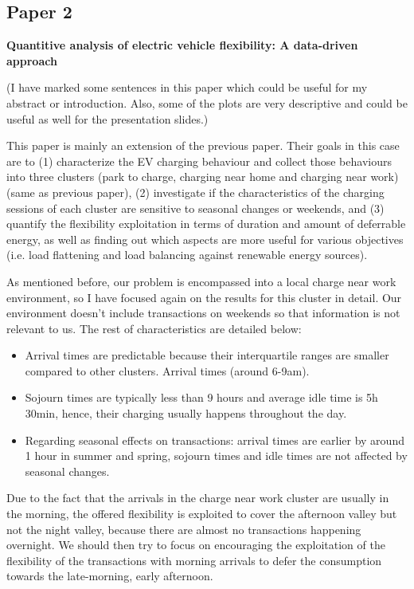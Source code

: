\subsection{Paper 2}
\textbf{Quantitive analysis of electric vehicle flexibility: A data-driven approach}

(I have marked some sentences in this paper which could be useful for my abstract or introduction. Also, some of the plots are very descriptive and could be useful as well for the presentation slides.)

This paper is mainly an extension of the previous paper. Their goals in this case are to (1) characterize the EV charging behaviour and collect those behaviours into three clusters (park to charge, charging near home and charging near work) (same as previous paper), (2) investigate if the characteristics of the charging sessions of each cluster are sensitive to seasonal changes or weekends, and (3) quantify the flexibility exploitation in terms of duration and amount of deferrable energy, as well as finding out which aspects are more useful for various objectives (i.e. load flattening and load balancing against renewable energy sources).

As mentioned before, our problem is encompassed into a local charge near work environment, so I have focused again on the results for this cluster in detail. Our environment doesn't include transactions on weekends so that information is not relevant to us. The rest of characteristics are detailed below: 

\begin{itemize}
  \item Arrival times are predictable because their interquartile ranges are smaller compared to other clusters. Arrival times (around 6-9am).
  \item Sojourn times are typically less than 9 hours and average idle time is 5h 30min, hence, their charging usually happens throughout the day.
  \item Regarding seasonal effects on transactions: arrival times are earlier by around 1 hour in summer and spring, sojourn times and idle times are not affected by seasonal changes.
\end{itemize}

Due to the fact that the arrivals in the charge near work cluster are usually in the morning, the offered flexibility is exploited to cover the afternoon valley but not the night valley, because there are almost no transactions happening overnight. We should then try to focus on encouraging the exploitation of the flexibility of the transactions with morning arrivals to defer the consumption towards the late-morning, early afternoon.

